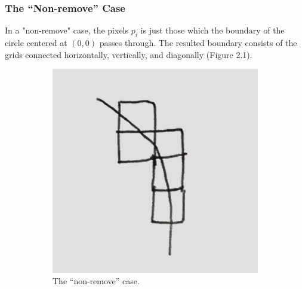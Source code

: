 \documentclass[letterpaper]{article}
\numberwithin{equation}{section} %
\numberwithin{figure}{section} %
\numberwithin{table}{section} %
\begin{document}
\subsubsection{The \enquote{Non-remove} Case}


In a "non-remove" case, the pixels $p_i$ is just those which the boundary of the circle centered at $(0,0)$ passes through. The resulted boundary consists of the grids connected horizontally, vertically, and diagonally (Figure 2.1). 

\begin{figure}[htbp]
	\centering
	\begin{subfigure}[b]{0.2\textwidth}
		\includegraphics[width=\textwidth]{NonrmvSetup}
		\caption{The \enquote{non-remove} case.}
		\label{NonrmvSetup}
	\end{subfigure}
	\begin{subfigure}[b]{0.2\textwidth}

\end{subfigure}
\end{figure}
\end{document}
